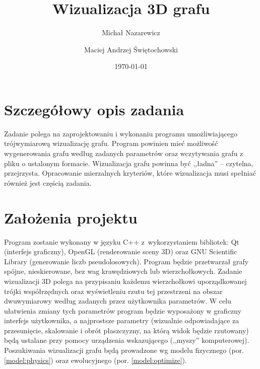 \documentclass[a4paper,onecolumn,oneside,12pt]{mwart}
\author{Michał Nazarewicz \and Maciej Andrzej Świętochowski}
\title{Wizualizacja 3D grafu}
\date{\today}
\begin{document}
\maketitle

\section{Szczegółowy opis zadania}

Zadanie polega na zaprojektowaniu i wykonaniu programu umożliwiającego
trójwymiarową wizualizację grafu. Program powinien mieć możliwość
wygenerowania grafu według zadanych parametrów oraz wczytywania grafu z
pliku o ustalonym formacie. Wizualizacja grafu powinna być ,,ładna'' --
czytelna, przejrzysta. Opracowanie mierzalnych kryteriów, które
wizualizacja musi spełniać również jest częścią zadania.

\section{Założenia projektu}

Program zostanie wykonany w języku C++ z~wykorzystaniem bibliotek: Qt
(interfejs graficzny), OpenGL (renderowanie sceny 3D) oraz GNU Scientific
Library (generowanie liczb pseudolosowych). Program będzie
przetwarzał grafy spójne, nieskierowane, bez wag krawędziowych lub
wierzchołkowych. Zadanie wizualizacji 3D polega na przypisaniu każdemu
wierzchołkowi uporządkowanej trójki współrzędnych oraz wyświetleniu rzutu
tej przestrzeni na obszar dwuwymiarowy według zadanych przez użytkownika
parametrów. W celu ułatwienia zmiany tych parametrów program będzie
wyposażony w graficzny interfejs użytkownika, a najprostsze parametry (wizualnie
odpowiadające za przesunięcie, skalowanie i obrót płaszczyzny, na którą
widok będzie rzutowany) będą ustalane przy pomocy urządzenia wskazującego
(,,myszy'' komputerowej). Poszukiwania wizualizacji grafu będą prowadzone
wg modelu fizycznego (por. \ref{model:physics}) oraz ewolucyjnego (por.
\ref{model:optimize}).
\end{document}
